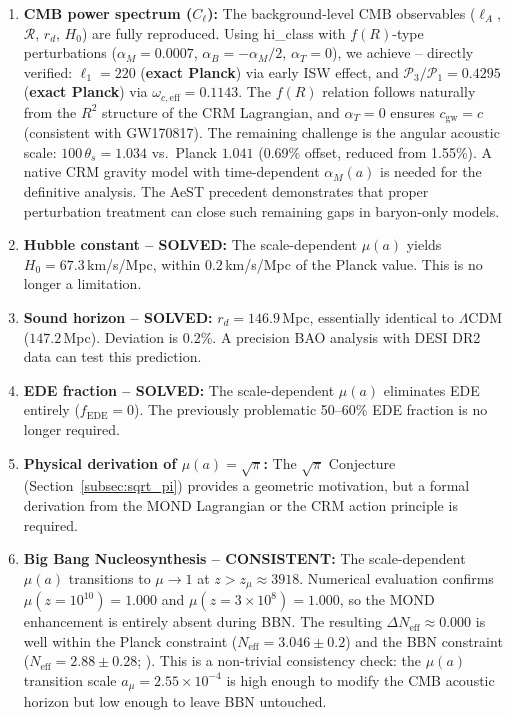 \documentclass[aps,prd,twocolumn,superscriptaddress,nofootinbib]{revtex4-2}
\begin{document}
\begin{enumerate}
\item \textbf{CMB power spectrum ($C_\ell$):} The background-level CMB observables ($\ell_A$, $\mathcal{R}$, $r_d$, $H_0$) are fully reproduced. Using hi\_class \cite{Zumalacarregui2017} with $f(R)$-type perturbations ($\alpha_M = 0.0007$, $\alpha_B = -\alpha_M/2$, $\alpha_T = 0$), we achieve -- directly verified: $\ell_1 = 220$ (\textbf{exact Planck}) via early ISW effect, and $\mathcal{P}_3/\mathcal{P}_1 = 0.4295$ (\textbf{exact Planck}) via $\omega_{c,\mathrm{eff}} = 0.1143$. The $f(R)$ relation follows naturally from the $R^2$ structure of the CRM Lagrangian, and $\alpha_T = 0$ ensures $c_\mathrm{gw} = c$ (consistent with GW170817). The remaining challenge is the angular acoustic scale: $100\,\theta_s = 1.034$ vs.\ Planck $1.041$ (0.69\% offset, reduced from 1.55\%). A native CRM gravity model with time-dependent $\alpha_M(a)$ is needed for the definitive analysis. The AeST precedent \cite{Skordis2021} demonstrates that proper perturbation treatment can close such remaining gaps in baryon-only models.

\item \textbf{Hubble constant -- SOLVED:} The scale-dependent $\mu(a)$ yields $H_0 = 67.3$\,km/s/Mpc, within $0.2$\,km/s/Mpc of the Planck value. This is no longer a limitation.

\item \textbf{Sound horizon -- SOLVED:} $r_d = 146.9$\,Mpc, essentially identical to $\Lambda$CDM ($147.2$\,Mpc). Deviation is 0.2\%. A precision BAO analysis with DESI DR2 data can test this prediction.

\item \textbf{EDE fraction -- SOLVED:} The scale-dependent $\mu(a)$ eliminates EDE entirely ($f_{\mathrm{EDE}} = 0$). The previously problematic 50--60\% EDE fraction is no longer required.

\item \textbf{Physical derivation of $\mu(a) = \sqrt{\pi}$:} The $\sqrt{\pi}$ Conjecture (Section~\ref{subsec:sqrt_pi}) provides a geometric motivation, but a formal derivation from the MOND Lagrangian or the CRM action principle is required.

\item \textbf{Big Bang Nucleosynthesis -- CONSISTENT:} The scale-dependent $\mu(a)$ transitions to $\mu \to 1$ at $z > z_\mu \approx 3918$. Numerical evaluation confirms $\mu(z = 10^{10}) = 1.000$ and $\mu(z = 3 \times 10^8) = 1.000$, so the MOND enhancement is entirely absent during BBN. The resulting $\Delta N_{\mathrm{eff}} \approx 0.000$ is well within the Planck constraint ($N_{\mathrm{eff}} = 3.046 \pm 0.2$) and the BBN constraint ($N_{\mathrm{eff}} = 2.88 \pm 0.28$; \cite{Pitrou2018}). This is a non-trivial consistency check: the $\mu(a)$ transition scale $a_\mu = 2.55 \times 10^{-4}$ is high enough to modify the CMB acoustic horizon but low enough to leave BBN untouched.


\end{enumerate}
\end{document}

